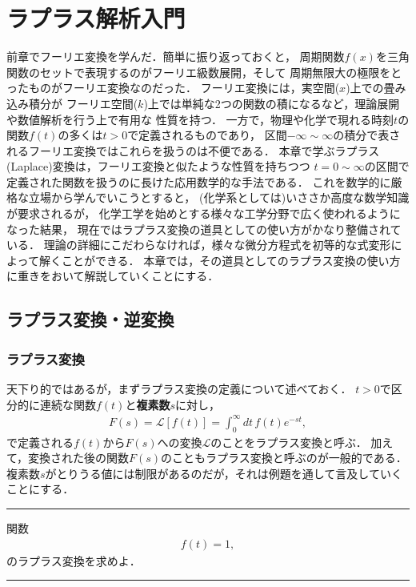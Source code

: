 \setcounter{chapter}{2}
\chapter{ラプラス解析入門}
%
前章でフーリエ変換を学んだ．簡単に振り返っておくと，
周期関数$f(x)$を三角関数のセットで表現するのがフーリエ級数展開，そして
周期無限大の極限をとったものがフーリエ変換なのだった．
%
フーリエ変換には，実空間($x$)上での畳み込み積分が
フーリエ空間($k$)上では単純な2つの関数の積になるなど，理論展開や数値解析を行う上で有用な
性質を持つ．
一方で，物理や化学で現れる時刻$t$の関数$f(t)$の多くは$t>0$で定義されるものであり，
区間$-\infty \sim \infty$の積分で表されるフーリエ変換ではこれらを扱うのは不便である．
本章で学ぶラプラス(Laplace)変換は，フーリエ変換と似たような性質を持ちつつ
$t=0\sim \infty$の区間で定義された関数を扱うのに長けた応用数学的な手法である．
これを数学的に厳格な立場から学んでいこうとすると，
(化学系としては)いささか高度な数学知識が要求されるが，
化学工学を始めとする様々な工学分野で広く使われるようになった結果，
現在ではラプラス変換の道具としての使い方がかなり整備されている．
理論の詳細にこだわらなければ，様々な微分方程式を初等的な式変形によって解くことができる．
本章では，その道具としてのラプラス変換の使い方に重きをおいて解説していくことにする．
%
\section{ラプラス変換・逆変換}
%
\subsection{ラプラス変換}
%
天下り的ではあるが，まずラプラス変換の定義について述べておく．
$t>0$で区分的に連続な関数$f(t)$と\textbf{複素数}$s$に対し，
\begin{align}
 F(s) = \mathcal{L}\left[f\left(t\right)\right] = \int_{0}^{\infty}dt\,f\left(t\right)e^{-st},
\end{align}
で定義される$f(t)$から$F(s)$への変換$\mathcal{L}$のことをラプラス変換と呼ぶ．
加えて，変換された後の関数$F(s)$のこともラプラス変換と呼ぶのが一般的である．
複素数$s$がとりうる値には制限があるのだが，それは例題を通して言及していくことにする．
%
\newpage
%
\hrule
\reidai
関数
\begin{align}
  f(t) = 1,
\end{align}
のラプラス変換を求めよ．
\vspace*{.2cm}
\hrule
\vspace*{.2cm}

